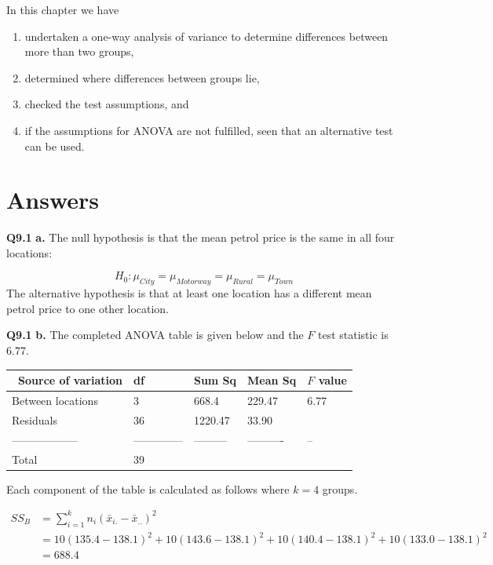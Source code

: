 \documentclass[
  oneside]{krantz}
\begin{document}
In this chapter we have

\begin{enumerate}
\def\labelenumi{\arabic{enumi}.}
\item
  undertaken a one-way analysis of variance to determine differences between more than two groups,
\item
  determined where differences between groups lie,
\item
  checked the test assumptions, and
\item
  if the assumptions for ANOVA are not fulfilled, seen that an alternative test can be used.
\end{enumerate}

\hypertarget{ANSanova}{%
\section{Answers}\label{ANSanova}}

\textbf{Q9.1} \textbf{a.} The null hypothesis is that the mean petrol price is the same in all four locations:

\[H_0: \mu_{City} = \mu_{Motorway} = \mu_{Rural} = \mu_{Town} \]
The alternative hypothesis is that at least one location has a different mean petrol price to one other location.

\textbf{Q9.1} \textbf{b.} The completed ANOVA table is given below and the \(F\) test statistic is 6.77.

\begin{longtable}[]{@{}lllll@{}}
\toprule
~Source of variation & df & Sum Sq & Mean Sq & \(F\) value\tabularnewline
\midrule
\endhead
Between locations & 3 & 668.4 & 229.47 & 6.77\tabularnewline
Residuals & 36 & 1220.47 & 33.90 &\tabularnewline
------------------ & -------------- & --------- & ---------- & --\tabularnewline
Total & 39 & & &\tabularnewline
\bottomrule
\end{longtable}

Each component of the table is calculated as follows where \(k = 4\) groups.

\begin{equation}\label{}
\begin{split}
SS_B & = \sum_{i=1}^{k} n_i (\bar{x}_{i.}-\bar{x}_{..})^2 \\
& = 10(135.4 - 138.1)^2 + 10(143.6 - 138.1)^2 + 10(140.4 - 138.1)^2 + 10(133.0 - 138.1)^2\\
& = 688.4
\end{split}
\end{equation}
\end{document}
